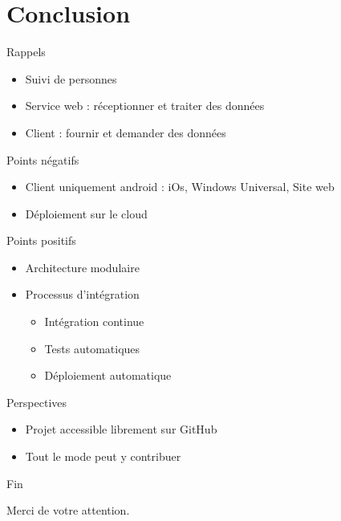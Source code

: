 \documentclass{beamer} %
\begin{document}
  \section{Conclusion}
  \begin{frame}{\secname}
      \begin{block}{Rappels}
        \begin{itemize}
          \item Suivi de personnes
          \item Service web : réceptionner et traiter des données
          \item Client : fournir et demander des données
        \end{itemize}
      \end{block}

      \pause

      \begin{alertblock}{Points négatifs}
        \begin{itemize}
          \item Client uniquement android : iOs, Windows Universal, Site web
          \item Déploiement sur le cloud
        \end{itemize}
      \end{alertblock}

  \end{frame}

  \begin{frame}{\secname}
    \begin{exampleblock}{Points positifs}
        \begin{itemize}
          \item Architecture modulaire
          \item Processus d'intégration
          \begin{itemize}
            \item Intégration continue
            \item Tests automatiques
            \item Déploiement automatique
          \end{itemize}
        \end{itemize}
      \end{exampleblock}

      \pause

      \begin{block}{Perspectives}
        \begin{itemize}
          \item Projet accessible librement sur GitHub
          \item Tout le mode peut y contribuer
        \end{itemize}
      \end{block}
  \end{frame}


  \begin{frame}{Fin}
    \begin{center}
      Merci de votre attention.
    \end{center}
  \end{frame}
\end{document}
